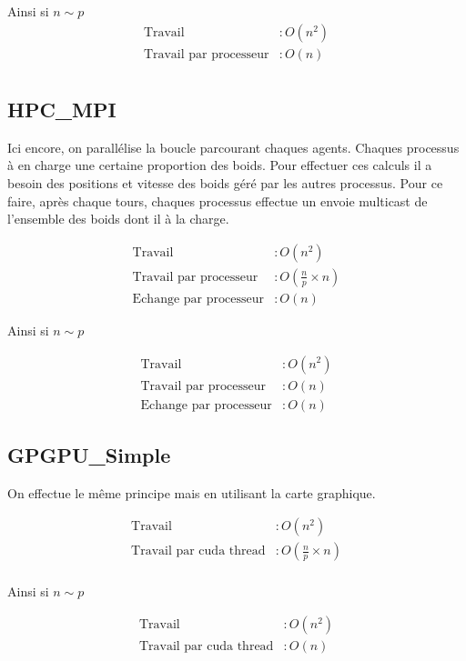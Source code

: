 \documentclass[liens,entete-ensimag,margeCorrection]{ensirapport}
\begin{document}
Ainsi si $n\sim p$
\begin{align*}
    \text{Travail} &: O\left( n^2 \right)  \\
    \text{Travail par processeur} &: O\left( n \right) \\
\end{align*}

\subsection{HPC\_MPI}
Ici encore, on parallélise la boucle parcourant chaques agents.
Chaques processus à en charge une certaine proportion des boids.
Pour effectuer ces calculs il a besoin des positions et vitesse des boids géré par les autres processus.
Pour ce faire, après chaque tours, chaques processus effectue un envoie multicast de l'ensemble des boids dont il à la charge.

\begin{align*}
    \text{Travail} &: O\left( n^2 \right) \\
    \text{Travail par processeur} &: O\left( \frac n p \times n \right)  \\
    \text{Echange par processeur} &: O\left(n\right)
\end{align*}

Ainsi si $n \sim p$

\begin{align*}
    \text{Travail} &: O\left( n^2 \right) \\
    \text{Travail par processeur} &: O\left( n \right)  \\
    \text{Echange par processeur} &: O\left(n\right)
\end{align*}

\subsection{GPGPU\_Simple}

On effectue le même principe mais en utilisant la carte graphique.

\begin{align*}
    \text{Travail} &: O\left( n^2 \right) \\
    \text{Travail par cuda thread} &: O\left( \frac n p \times n \right)  \\
\end{align*}

Ainsi si $n \sim p$

\begin{align*}
    \text{Travail} &: O\left( n^2 \right) \\
    \text{Travail par cuda thread} &: O\left( n \right)  \\
\end{align*}
\end{document}
